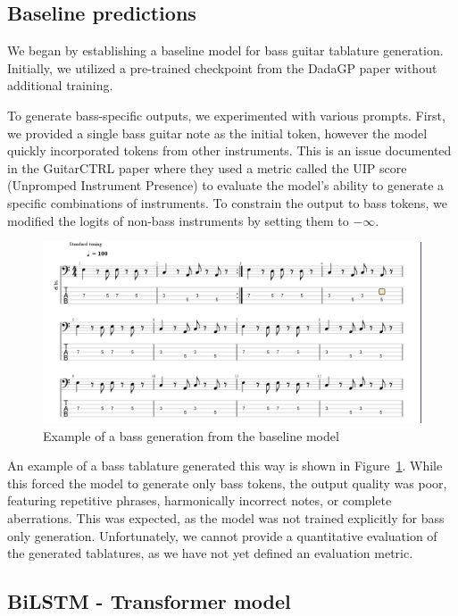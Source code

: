\subsection{Baseline predictions}

We began by establishing a baseline model for bass guitar tablature generation.
Initially, we utilized a pre-trained checkpoint from the DadaGP paper \cite{sarmento_dadagp_2021} without additional training.

To generate bass-specific outputs, we experimented with various prompts.
First, we provided a single bass guitar note as the initial token, however the model quickly incorporated tokens from other instruments.
This is an issue documented in the GuitarCTRL paper\cite{sarmento_gtr-ctrl_2023} where they used a metric called the UIP score (Unpromped Instrument Presence) to evaluate the model's ability to generate a specific combinations of instruments.
To constrain the output to bass tokens, we modified the logits of non-bass instruments by setting them to $-\infty$.

\begin{figure}[!ht]
    \centering
    \includegraphics[width=.75\linewidth]{../images-figures/generated_bass_baseline.png}
    \caption{Example of a bass generation from the baseline model}
    \label{fig:repetitive_generation}
\end{figure}

An example of a bass tablature generated this way is shown in Figure~\ref{fig:repetitive_generation}.
While this forced the model to generate only bass tokens, the output quality was poor, featuring repetitive phrases, harmonically incorrect notes, or complete aberrations.
This was expected, as the model was not trained explicitly for bass only generation. 
Unfortunately, we cannot provide a quantitative evaluation of the generated tablatures, as we have not yet defined an evaluation metric.

\newpage

\subsection{BiLSTM - Transformer model}

